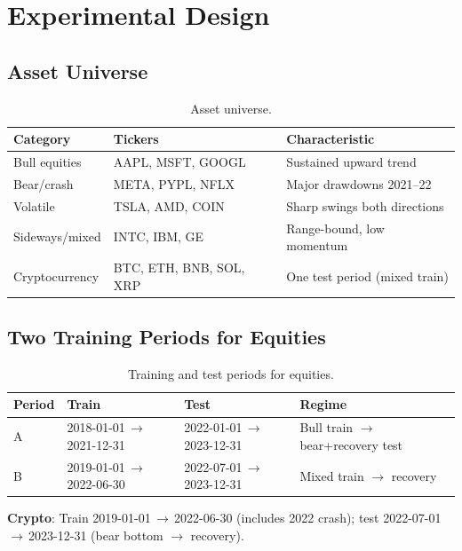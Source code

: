 \documentclass[12pt,a4paper]{article}
\begin{document}
\section{Experimental Design}

\subsection{Asset Universe}

\begin{table}[H]
\centering
\caption{Asset universe.}
\label{tab:assets}
\begin{tabular}{lll}
\toprule
\textbf{Category} & \textbf{Tickers} & \textbf{Characteristic} \\
\midrule
Bull equities     & AAPL, MSFT, GOOGL        & Sustained upward trend \\
Bear/crash        & META, PYPL, NFLX         & Major drawdowns 2021--22 \\
Volatile          & TSLA, AMD, COIN          & Sharp swings both directions \\
Sideways/mixed    & INTC, IBM, GE            & Range-bound, low momentum \\
\midrule
Cryptocurrency    & BTC, ETH, BNB, SOL, XRP  & One test period (mixed train) \\
\bottomrule
\end{tabular}
\end{table}

\subsection{Two Training Periods for Equities}

\begin{table}[H]
\centering
\caption{Training and test periods for equities.}
\label{tab:periods}
\begin{tabular}{llll}
\toprule
\textbf{Period} & \textbf{Train} & \textbf{Test} & \textbf{Regime} \\
\midrule
A & 2018-01-01\,$\to$\,2021-12-31 & 2022-01-01\,$\to$\,2023-12-31 &
  Bull train $\to$ bear+recovery test \\
B & 2019-01-01\,$\to$\,2022-06-30 & 2022-07-01\,$\to$\,2023-12-31 &
  Mixed train $\to$ recovery \\
\bottomrule
\end{tabular}
\end{table}

\noindent\textbf{Crypto}: Train 2019-01-01\,$\to$\,2022-06-30 (includes 2022 crash);
test 2022-07-01\,$\to$\,2023-12-31 (bear bottom $\to$ recovery).
\end{document}
